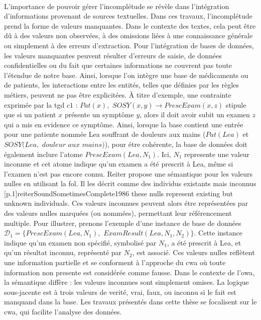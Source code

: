 \paragraph{}
L'importance de pouvoir gérer l'incomplétude se révèle dans l'intégration d'informations provenant de sources textuelles.
Dans ces travaux, l'incomplétude prend la forme de valeurs manquantes.
Dans le contexte des textes, cela peut être dû à des valeurs non observées, à des omissions liées à une connaissance générale ou simplement à des erreurs d'extraction.
Pour l'intégration de bases de données, les valeurs manquantes peuvent résulter d'erreurs de saisie, de données confidentielles ou du fait que certaines informations ne couvrent pas toute l'étendue de notre base.
Ainsi, lorsque l'on intègre une base de médicaments ou de patients, les interactions entre les entités, telles que définies par les règles métiers, peuvent ne pas être explicitées.
À titre d'exemple, une contrainte exprimée par la \gls{tgd} $c1$ : $Pat(x),$ $SOSY(x, y) \rightarrow PrescExam(x, z)$ stipule que si un patient $x$ présente un symptôme $y$, alors il doit avoir subit un examen $z$ qui a mis en evidence ce symptôme.
Ainsi, lorsque la base contient une entrée pour une patiente nommée Lea souffrant de douleurs aux mains ($Pat(Lea)$ et $ SOSY(Lea,$ $\textit{douleur aux mains})$), pour étre cohérente, la base de données doit également inclure l'atome $PrescExam(Lea, N_1)$.
Ici, $N_1$ represente une valeur inconnue et cet atome indique qu'un examen a été prescrit à Lea, même si l'examen n'est pas encore connu.
Reiter propose une sémantique pour les valeurs nulles en utilisant la \gls{fol}.
Il les décrit comme des individus existants mais inconnus [p.1]{reiterSoundSometimesComplete1986}{\label{reiterSemantic}\textelp{} these nulls represent existing but unknown individuals}.
Ces valeurs inconnues peuvent alors étre représentées par des valeurs nulles marquées (ou nommées), permettant leur référencement multiple.
Pour illustrer, prenons l'exemple d'une instance de base de données $\mathcal{D}_1= \{PrescExam(Lea, N_1),$ $ExamResult(Lea, N_1, N_2)\}$.
Cette instance indique qu'un examen non spécifié, symbolisé par $N_1$, a été prescrit à Lea, et qu'un résultat inconnu, représenté par $N_2$, est associé.
Ces valeurs nulles reflètent une information partielle et se conforment à l'approche du \gls{cwa} où toute information non presente est considérée comme fausse.
Dans le contexte de l'\gls{owa}, la sémantique diffère : les valeurs inconnues sont simplement omises. %
La logique sous-jacente est à trois valeurs de verité, vrai, faux, ou inconnu si le fait est manquand dans la base.
Les travaux présentés dans cette thèse se focalisent sur le \gls{cwa}, qui facilite l'analyse des données. %

